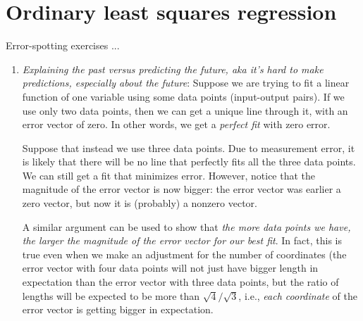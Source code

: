 \documentclass[10pt]{amsart}
\begin{document}
\section{Ordinary least squares regression}

Error-spotting exercises ...

\begin{enumerate}
\item {\em Explaining the past versus predicting the future, aka it's
  hard to make predictions, especially about the future}: Suppose we
  are trying to fit a linear function of one variable using some data
  points (input-output pairs). If we use only two data points, then we
  can get a unique line through it, with an error vector of zero. In
  other words, we get a {\em perfect fit} with zero error.

  Suppose that instead we use three data points. Due to measurement
  error, it is likely that there will be no line that perfectly fits
  all the three data points. We can still get a fit that minimizes
  error. However, notice that the magnitude of the error vector is now
  bigger: the error vector was earlier a zero vector, but now it is
  (probably) a nonzero vector.

  A similar argument can be used to show that {\em the more data
    points we have, the larger the magnitude of the error vector for
    our best fit}. In fact, this is true even when we make an
  adjustment for the number of coordinates (the error vector with four
  data points will not just have bigger length in expectation than the
  error vector with three data points, but the ratio of lengths will
  be expected to be more than $\sqrt{4}/\sqrt{3}$, i.e., {\em each
    coordinate} of the error vector is getting bigger in expectation.


\end{enumerate}
\end{document}
